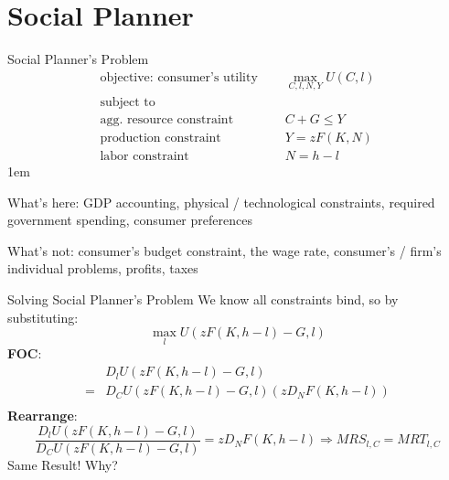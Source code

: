 \documentclass[11pt,aspectratio=43]{beamer}
\let\olditemize=\itemize
\let\endolditemize=\enditemize
\renewenvironment{itemize}{\olditemize \itemsep1em}{\endolditemize}
\theoremstyle{definition}
\begin{document}
\section{Social Planner}
\label{sec:Social_Planner_s_Problem}

\begin{frame}{Social Planner's Problem}
\label{slide:Social_Planner_s_Problem}
    \begin{align}
        \text{objective: consumer's utility } \quad
            & \max_{C, l, N, Y} U( C, l )
        \\
        \text{subject to} \quad
            &
        \\
        \text{agg. resource constraint} \quad
            &  C + G \le Y
        \\
        \text{production constraint} \quad
            & Y = z F( K, N )
        \\
        \text{labor constraint} \quad
            & N = h - l
    \end{align}
    \begin{itemize}
        \item \alert{What’s here}: GDP accounting, physical / technological constraints, required government spending, consumer preferences
        \item \alert{What's not}: consumer’s budget constraint, the wage rate, consumer’s / firm’s individual problems, profits, taxes
    \end{itemize}
\end{frame}

\begin{frame}{Solving Social Planner's Problem}
\label{slide:Solving_Social_Planner_s_Problem}
    We know all constraints bind, so by substituting:
    \begin{equation}
    \label{eq:SPPSolve}
        \max_{l} U( z F( K, h-l ) - G, l )
    \end{equation}
    \textbf{FOC}:
    \begin{equation}
    \label{eq:SPPFOC}
        \begin{split}
                & D_{l} U( z F( K, h-l ) - G, l)
            \\
               = &  D_{C}U( z F( K, h-l ) - G, l ) ( z D_{N} F( K, h-l ) )
            \\
        \end{split}
    \end{equation}
    \textbf{Rearrange}:
    \begin{equation}
    \label{eq:SPPRearrange}
        \frac{D_{l} U( z F( K, h-l ) - G, l)}{D_{C}U( z F( K, h-l ) - G, l )} = z D_{N} F( K, h-l ) \Rightarrow MRS_{l, C}  = MRT_{l, C}
    \end{equation}
    Same Result! Why?
\end{frame}
\end{document}
